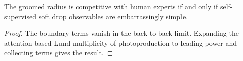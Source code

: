 \begin{lemma}[Renormalization]\label{thm:2}
The groomed radius is competitive with human experts if and only if
self-supervised soft drop observables are embarrassingly simple.
\end{lemma}

\begin{proof}
The boundary terms vanish in the back-to-back limit. Expanding the
attention-based Lund multiplicity of photoproduction to leading power
and collecting terms gives the result.
\end{proof}

